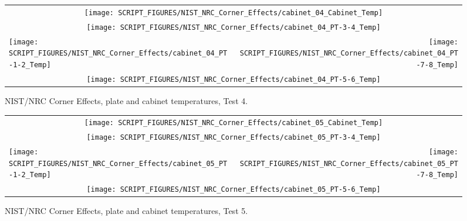 \begin{figure}[p]
\begin{tabular*}{\textwidth}{l@{\extracolsep{\fill}}r}
\multicolumn{2}{c}{\texttt{[image: SCRIPT\_FIGURES/NIST\_NRC\_Corner\_Effects/cabinet\_04\_Cabinet\_Temp]}} \\
\multicolumn{2}{c}{\texttt{[image: SCRIPT\_FIGURES/NIST\_NRC\_Corner\_Effects/cabinet\_04\_PT-3-4\_Temp]}} \\
\texttt{[image: SCRIPT\_FIGURES/NIST\_NRC\_Corner\_Effects/cabinet\_04\_PT-1-2\_Temp]} &
\texttt{[image: SCRIPT\_FIGURES/NIST\_NRC\_Corner\_Effects/cabinet\_04\_PT-7-8\_Temp]} \\
\multicolumn{2}{c}{\texttt{[image: SCRIPT\_FIGURES/NIST\_NRC\_Corner\_Effects/cabinet\_04\_PT-5-6\_Temp]}}
\end{tabular*}
\caption[NIST/NRC Corner Effects, plate and cabinet temperatures, Test 4]{NIST/NRC Corner Effects, plate and cabinet temperatures, Test 4.}
\label{NIST_NRC_Cabinet_PT_Test_4}
\end{figure}

\begin{figure}[p]
\begin{tabular*}{\textwidth}{l@{\extracolsep{\fill}}r}
\multicolumn{2}{c}{\texttt{[image: SCRIPT\_FIGURES/NIST\_NRC\_Corner\_Effects/cabinet\_05\_Cabinet\_Temp]}} \\
\multicolumn{2}{c}{\texttt{[image: SCRIPT\_FIGURES/NIST\_NRC\_Corner\_Effects/cabinet\_05\_PT-3-4\_Temp]}} \\
\texttt{[image: SCRIPT\_FIGURES/NIST\_NRC\_Corner\_Effects/cabinet\_05\_PT-1-2\_Temp]} &
\texttt{[image: SCRIPT\_FIGURES/NIST\_NRC\_Corner\_Effects/cabinet\_05\_PT-7-8\_Temp]} \\
\multicolumn{2}{c}{\texttt{[image: SCRIPT\_FIGURES/NIST\_NRC\_Corner\_Effects/cabinet\_05\_PT-5-6\_Temp]}}
\end{tabular*}
\caption[NIST/NRC Corner Effects, plate and cabinet temperatures, Test 5]{NIST/NRC Corner Effects, plate and cabinet temperatures, Test 5.}
\label{NIST_NRC_Cabinet_PT_Test_5}
\end{figure}

